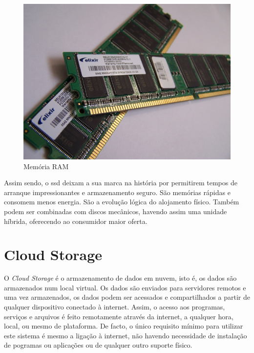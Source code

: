 \documentclass{report}
\begin{document}
	\begin{figure} [h]
		\centering
		\includegraphics[scale=0.09]{memram.jpg}
		\caption{Memória RAM}
	\end{figure}

\vspace{20mm}	
	
	Assim sendo, o \ac{ssd} deixam a sua marca na história por permitirem tempos de arranque impressionantes e armazenamento seguro. São memórias rápidas e consomem menos energia. São a evolução lógica do alojamento físico. Também podem ser combinadas com discos mecânicos, havendo assim uma unidade híbrida, oferecendo ao consumidor maior oferta.

\newpage

		\section{Cloud Storage}
		
		O \textit{Cloud Storage} é o armazenamento de dados em nuvem, isto é,  os dados são armazenados num local virtual.  Os dados são enviados para servidores remotos e uma vez armazenados, os dados podem ser acessados e compartilhados a partir de qualquer dispositivo conectado à internet.
 Assim, o acesso aos programas, serviços e arquivos é feito remotamente através da internet, a qualquer hora, local, ou mesmo de plataforma. De facto, o único requisito mínimo para utilizar este sistema é mesmo a ligação à internet, não havendo necessidade de instalação de pogramas ou aplicações ou de qualquer outro suporte físico.
\vspace{1mm}
\end{document}

